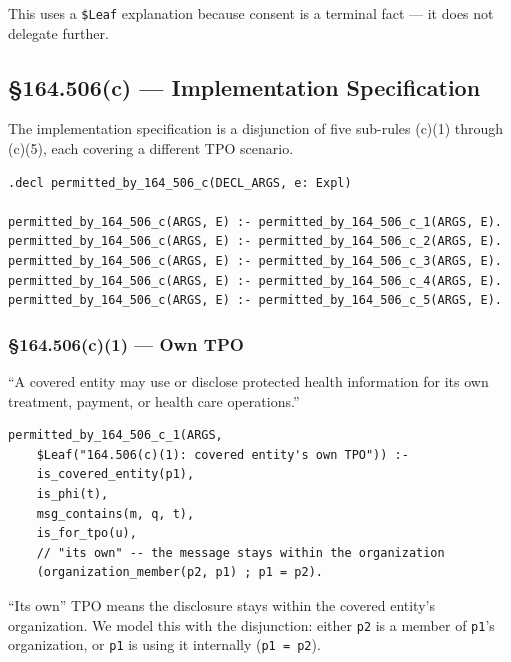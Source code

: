 \documentclass[11pt,letterpaper]{article}
\begin{document}
This uses a \texttt{\$Leaf} explanation because consent is a terminal fact --- it does not delegate further.

\subsection{\S 164.506(c) --- Implementation Specification}

\begin{hipaabox}
The implementation specification is a disjunction of five sub-rules (c)(1) through (c)(5), each covering a different TPO scenario.
\end{hipaabox}

\begin{lstlisting}[style=soufflestyle,caption={\S 164.506(c) --- disjunction of sub-rules}]
.decl permitted_by_164_506_c(DECL_ARGS, e: Expl)

permitted_by_164_506_c(ARGS, E) :- permitted_by_164_506_c_1(ARGS, E).
permitted_by_164_506_c(ARGS, E) :- permitted_by_164_506_c_2(ARGS, E).
permitted_by_164_506_c(ARGS, E) :- permitted_by_164_506_c_3(ARGS, E).
permitted_by_164_506_c(ARGS, E) :- permitted_by_164_506_c_4(ARGS, E).
permitted_by_164_506_c(ARGS, E) :- permitted_by_164_506_c_5(ARGS, E).
\end{lstlisting}

\subsubsection{\S 164.506(c)(1) --- Own TPO}

\begin{hipaabox}
``A covered entity may use or disclose protected health information for its own treatment, payment, or health care operations.''
\end{hipaabox}

\begin{lstlisting}[style=soufflestyle,caption={\S 164.506(c)(1)}]
permitted_by_164_506_c_1(ARGS,
    $Leaf("164.506(c)(1): covered entity's own TPO")) :-
    is_covered_entity(p1),
    is_phi(t),
    msg_contains(m, q, t),
    is_for_tpo(u),
    // "its own" -- the message stays within the organization
    (organization_member(p2, p1) ; p1 = p2).
\end{lstlisting}

\begin{designbox}
``Its own'' TPO means the disclosure stays within the covered entity's organization. We model this with the disjunction: either \texttt{p2} is a member of \texttt{p1}'s organization, or \texttt{p1} is using it internally (\texttt{p1 = p2}).
\end{designbox}
\end{document}
